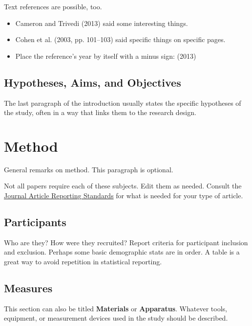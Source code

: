 \documentclass[
  man,
  floatsintext,
  colorlinks=true,linkcolor=blue,citecolor=blue,urlcolor=blue,biblatex]{apa7}
\begin{document}
Text references are possible, too.

\begin{itemize}
\item
  Cameron and Trivedi (2013) said some interesting things.
\item
  Cohen et al. (2003, pp. 101--103) said specific things on specific
  pages.
\item
  Place the reference's year by itself with a minus sign: (2013)
\end{itemize}

\hypertarget{hypotheses-aims-and-objectives}{%
\subsection{Hypotheses, Aims, and
Objectives}\label{hypotheses-aims-and-objectives}}

The last paragraph of the introduction usually states the specific
hypotheses of the study, often in a way that links them to the research
design.

\hypertarget{method}{%
\section{Method}\label{method}}

General remarks on method. This paragraph is optional.

Not all papers require each of these subjects. Edit them as needed.
Consult the \href{https://apastyle.apa.org/jars}{Journal Article
Reporting Standards} for what is needed for your type of article.

\hypertarget{participants}{%
\subsection{Participants}\label{participants}}

Who are they? How were they recruited? Report criteria for participant
inclusion and exclusion. Perhaps some basic demographic stats are in
order. A table is a great way to avoid repetition in statistical
reporting.

\hypertarget{measures}{%
\subsection{Measures}\label{measures}}

This section can also be titled \textbf{Materials} or
\textbf{Apparatus}. Whatever tools, equipment, or measurement devices
used in the study should be described.
\end{document}
